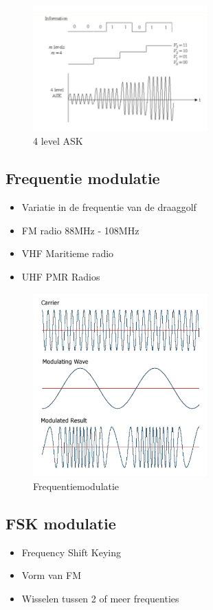 \documentclass{article}
\begin{document}
\begin{figure}[H]
    \centering
    \includegraphics[width=0.6\textwidth]{Screenshot_20200302_121031.png}
    \caption{4 level ASK}
\end{figure}

\subsection{Frequentie modulatie}
\begin{itemize}
    \item Variatie in de frequentie van de draaggolf
    \item FM radio 88MHz - 108MHz
    \item VHF Maritieme radio
    \item UHF PMR Radios
\end{itemize}

\begin{figure}[H]
    \centering
    \includegraphics[width=0.6\textwidth]{Screenshot_20200302_121335.png}
    \caption{Frequentiemodulatie}
\end{figure}

\subsection{FSK modulatie}
\begin{itemize}
    \item Frequency Shift Keying
    \item Vorm van FM
    \item Wisselen tussen 2 of meer frequenties
\end{itemize}
\end{document}
